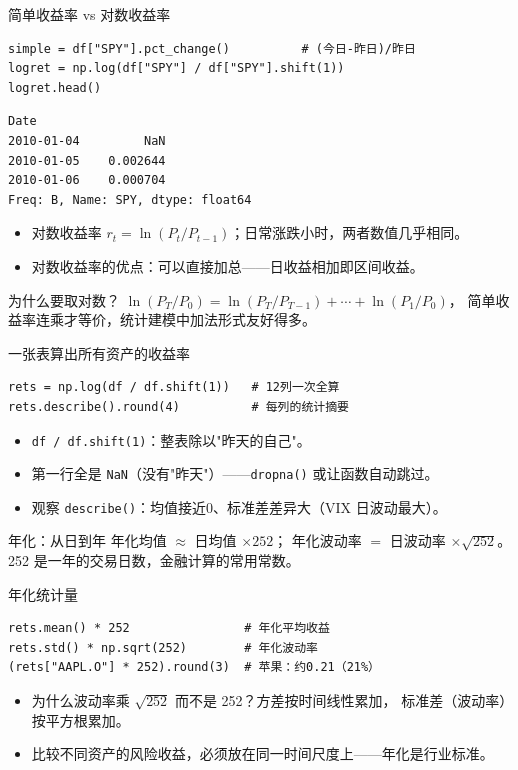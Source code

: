 \documentclass[9pt]{ctexbeamer}
\begin{document}
\begin{frame}[fragile]{简单收益率 vs 对数收益率}
	\begin{lstlisting}
simple = df["SPY"].pct_change()          # (今日-昨日)/昨日
logret = np.log(df["SPY"] / df["SPY"].shift(1))
logret.head()
\end{lstlisting}
	\begin{lstlisting}
Date
2010-01-04         NaN
2010-01-05    0.002644
2010-01-06    0.000704
Freq: B, Name: SPY, dtype: float64
\end{lstlisting}
	\begin{itemize}
		\item 对数收益率 $r_t = \ln(P_t / P_{t-1})$；日常涨跌小时，两者数值几乎相同。
		\item 对数收益率的优点：\alert{可以直接加总}——日收益相加即区间收益。
	\end{itemize}
	\begin{alertblock}{为什么要取对数？}
		$\ln(P_T/P_0) = \ln(P_T/P_{T-1}) + \cdots + \ln(P_1/P_0)$，
		简单收益率连乘才等价，统计建模中加法形式友好得多。
	\end{alertblock}
\end{frame}

\begin{frame}[fragile]{一张表算出所有资产的收益率}
	\begin{lstlisting}
rets = np.log(df / df.shift(1))   # 12列一次全算
rets.describe().round(4)          # 每列的统计摘要
\end{lstlisting}
	\begin{itemize}
		\item \texttt{df / df.shift(1)}：整表除以"昨天的自己"。
		\item 第一行全是 \texttt{NaN}（没有"昨天"）——\texttt{dropna()} 或让函数自动跳过。
		\item 观察 \texttt{describe()}：均值接近0、标准差差异大（VIX 日波动最大）。
	\end{itemize}
	\begin{block}{年化：从日到年}
		年化均值 $\approx$ 日均值 $\times 252$；
		年化波动率 $=$ 日波动率 $\times \sqrt{252}$。\\
		252 是一年的交易日数，金融计算的常用常数。
	\end{block}
\end{frame}

\begin{frame}[fragile]{年化统计量}
	\begin{lstlisting}
rets.mean() * 252                # 年化平均收益
rets.std() * np.sqrt(252)        # 年化波动率
(rets["AAPL.O"] * 252).round(3)  # 苹果：约0.21（21%）
\end{lstlisting}
	\begin{itemize}
		\item 为什么波动率乘 $\sqrt{252}$ 而不是 252？方差按时间线性累加，
			标准差（波动率）按平方根累加。
		\item 比较不同资产的风险收益，必须放在同一时间尺度上——年化是行业标准。
	\end{itemize}
\end{frame}
\end{document}
